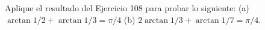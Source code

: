 \item Aplique el resultado del Ejercicio 108 para probar lo siguiente: (a) $\arctan 1/2 + \arctan 1/3 = \pi/4$ \quad (b) $2 \arctan 1/3 + \arctan 1/7 = \pi/4$.
